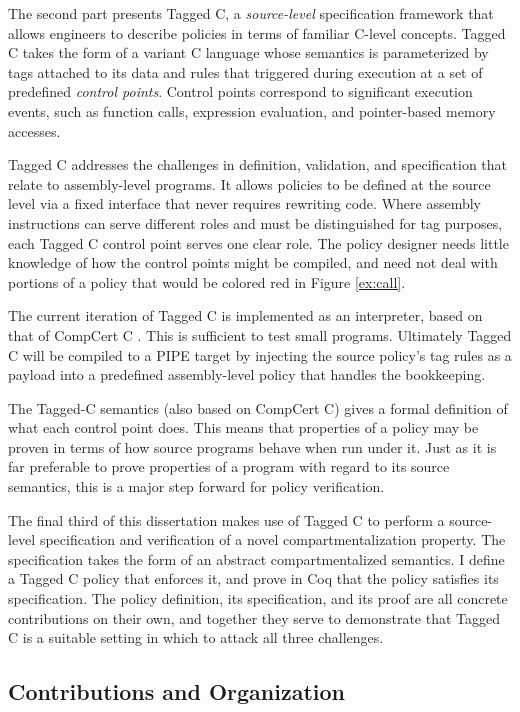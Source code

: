 \documentclass{report}
\begin{document}
The second part presents Tagged C, a \emph{source-level} specification framework that allows
engineers to describe policies in terms of familiar C-level concepts.
Tagged C takes the form of a variant C language whose semantics is parameterized by tags
attached to its data and rules that triggered during execution at a set of predefined
\emph{control points}. Control points correspond to significant execution events, such as
function calls, expression evaluation, and pointer-based memory accesses.

Tagged C addresses the challenges in definition, validation, and specification that relate to
assembly-level programs. It allows policies to be defined at the source level via a fixed interface
that never requires rewriting code. Where assembly instructions can serve different roles and must
be distinguished for tag purposes, each Tagged C control point serves one clear role. The policy
designer needs little knowledge of how the control points might be compiled, and need not
deal with portions of a policy that would be colored red in Figure \ref{ex:call}.

The current iteration of Tagged C is implemented as an interpreter, based on that of
CompCert C \cite{Leroy09:CompCert}. This is sufficient to test small programs. Ultimately
Tagged C will be compiled to a PIPE target by injecting the source policy's tag rules
as a payload into a predefined assembly-level policy that handles the bookkeeping.

The Tagged-C semantics (also based on CompCert C) gives a formal definition of what each
control point does. This means that properties of a policy may be proven in terms of how
source programs behave when run under it. Just as it is far preferable to prove properties
of a program with regard to its source semantics, this is a major step forward for policy
verification.

The final third of this dissertation makes use of Tagged C to perform a source-level specification and
verification of a novel compartmentalization property. The specification takes the form of
an abstract compartmentalized semantics. I define a Tagged C policy that enforces it,
and prove in Coq that the policy satisfies its specification. The policy definition, its
specification, and its proof are all concrete contributions on their own, and together they
serve to demonstrate that Tagged C is a suitable setting in which to attack all three
challenges.

\subsection{Contributions and Organization}
\end{document}
